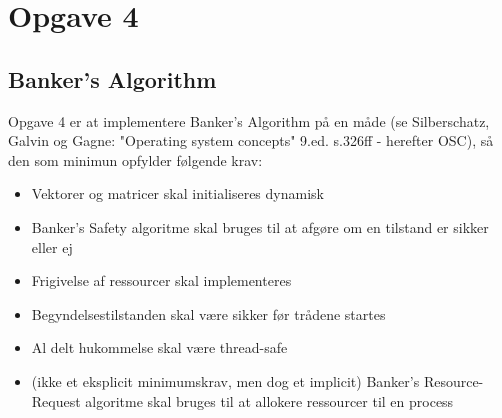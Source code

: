 \section{Opgave 4}
\subsection{Banker's Algorithm}
Opgave 4 er at implementere Banker's Algorithm på en måde (se Silberschatz, Galvin og Gagne: "Operating system concepts" 9.ed. s.326ff - herefter OSC), så den som minimun opfylder følgende krav:
\begin{itemize}
	\item Vektorer og matricer skal initialiseres dynamisk
	\item Banker's Safety algoritme skal bruges til at afgøre om en tilstand er sikker eller ej
	\item Frigivelse af ressourcer skal implementeres
	\item Begyndelsestilstanden skal være sikker før trådene startes
	\item Al delt hukommelse skal være thread-safe
	\item (ikke et eksplicit minimumskrav, men dog et implicit) Banker's Resource-Request algoritme skal bruges til at allokere ressourcer til en process
\end{itemize}

